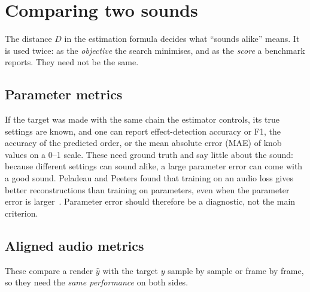 \section{Comparing two sounds}
\label{sec:metrics}

The distance $D$ in the estimation formula decides what ``sounds alike'' means.
It is used twice: as the \emph{objective} the search minimises, and as the
\emph{score} a benchmark reports. They need not be the same.

\subsection{Parameter metrics}

If the target was made with the same chain the estimator controls, its true
settings are known, and one can report effect-detection accuracy or F1, the
accuracy of the predicted order, or the mean absolute error (MAE) of knob values
on a 0--1 scale. These need ground truth and say little about the sound: because
different settings can sound alike, a large parameter error can come with a good
sound. Peladeau and Peeters found that training on an audio loss gives better
reconstructions than training on parameters, even when the parameter error is
larger~\cite{peladeau2024blind}. Parameter error should therefore be a
diagnostic, not the main criterion.

\subsection{Aligned audio metrics}

These compare a render $\hat y$ with the target $y$ sample by sample or frame by
frame, so they need the \emph{same performance} on both sides.

